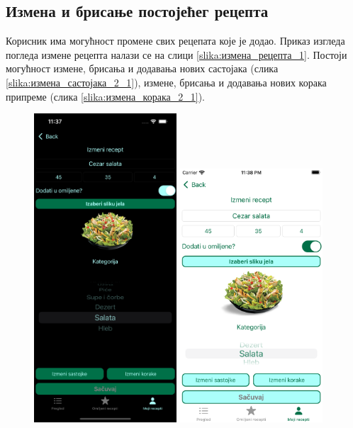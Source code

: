 \documentclass[12pt,oneside]{memoir}
\begin{document}
\subsection{Измена и брисање постојећег рецепта}
\label{subsec:Измена и брисање постојећег рецепта}

\indent Корисник има могућност промене свих рецепата које је додао. Приказ изгледа погледа измене рецепта налази се на слици \ref{slika:измена_рецепта_1}. Постоји могућност измене, брисања и додавања нових састојака (слика \ref{slika:измена_састојака_2_1}), измене, брисања и додавања нових корака припреме (слика \ref{slika:измена_корака_2_1}).

\begin{figure} [H]
    \centering
    \captionsetup{justification=centering}
    \includegraphics[width=0.475\textwidth]{images/simulators/view images/dark - change.png} 
    \hfill
    \includegraphics[width=0.475\textwidth]{images/simulators/view images/light - change.png} 

\end{figure}
\end{document}
